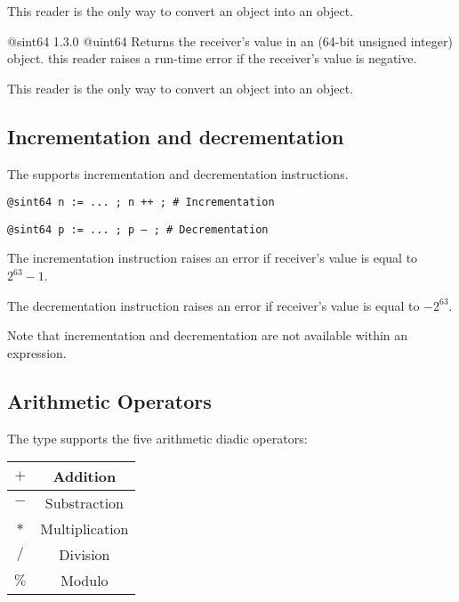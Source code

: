 This reader is the only way to convert an  object into an  object.





{@sint64}
{1.3.0}
{@uint64}
{Returns the receiver's value in an  (64-bit unsigned integer) object.}
{this reader raises a run-time error if the receiver's value is negative.}

This reader is the only way to convert an  object into an  object.







\subsection{Incrementation and decrementation}

The  supports incrementation and decrementation instructions.

\texttt{@sint64 n := ... ; n ++ ; \# Incrementation}

\texttt{@sint64 p := ... ; p -- ; \# Decrementation}\newline

The incrementation instruction raises an error if receiver's value is equal to $2^{63}-1$.\newline

The decrementation instruction raises an error if receiver's value is equal to $-2^{63}$.\newline

Note that incrementation and decrementation are not available within an expression.




\subsection{Arithmetic Operators}

The  type supports the five arithmetic diadic operators:\newline

\begin{tabular}{|c|c|}
\hline
$+$ & Addition \\
\hline
$-$ & Substraction \\
\hline
$*$ & Multiplication \\
\hline
$/$ & Division \\
\hline
$\%$ & Modulo \\
\hline
\end{tabular}\newline

